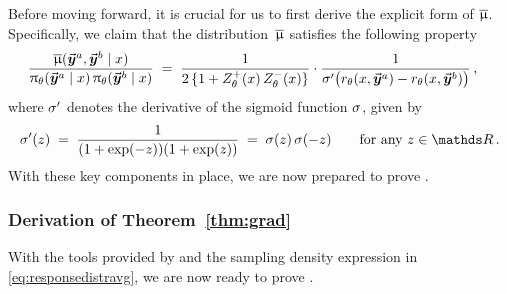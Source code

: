 	Before moving forward, it is crucial for us to first derive the explicit form of $\overline{\upmu}$. Specifically, we claim that the distribution~$\overline{\upmu}$ satisfies the following property
	\begin{align}
		\label{eq:responsedistravg}
		\frac{\overline{\upmu} ( \vec{\boldsymbol{y}}\!\,^a, \vec{\boldsymbol{y}}\!\,^b \mid x )}{\uppi_{\theta}(\vec{\boldsymbol{y}}\!\,^a \mid x) \, \uppi_{\theta}(\vec{\boldsymbol{y}}\!\,^b \mid x)} 
		& \; = \; \frac{1}{2 \, \{ 1 + Z_{\theta}^+(x) \, Z_{\theta}^-(x) \}}
		\cdot \frac{1}{\sigma' \big( r_{\theta}(x, \vec{\boldsymbol{y}}\!\,^a) - r_{\theta}(x, \vec{\boldsymbol{y}}\!\,^b) \big)} \, ,
	\end{align}
	where $\sigma'$ denotes the derivative of the sigmoid function $\sigma$, given by
	\begin{align}
		\label{eq:divsigmoid}
		\divsigmoid(z) \; = \; \frac{1}{( 1 + \exp(-z) )( 1 + \exp(z) )} \; = \; \sigmoid(z) \, \sigmoid(-z)
		\qquad \mbox{for any $z \in \Real$}  \, .
	\end{align}
	With these key components in place, we are now prepared to prove .
	
	
	\subsubsection{Derivation of Theorem~\ref{thm:grad} \yaqidone}
	\label{sec:proof:thm:grad_2}
	
	With the tools provided by  and the sampling density expression in \eqref{eq:responsedistravg}, we are now ready to prove .
	
